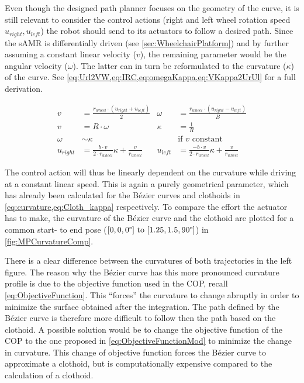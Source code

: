 Even though the designed path planner focuses on the geometry of the curve, it is still relevant to consider the control actions (right and left wheel rotation speed $u_{right},u_{left}$) the robot should send to its actuators to follow a desired path. Since the sAMR is differentially driven (see \cref{sec:WheelchairPlatform}) and by further assuming a constant linear velocity ($v$), the remaining parameter would be the angular velocity ($\omega$). The latter can in turn be reformulated to the curvature ($\kappa$) of the curve. See \cref{eq:Url2VW,eq:IRC,eq:omegaKappa,eq:VKappa2UrUl} for a full derivation. 

\begin{align}
v &= \frac{r_{wheel}\cdot(u_{right} + u_{left})}{2} & \omega &= \frac{r_{wheel}\cdot(u_{right} - u_{left})}{B} \label{eq:Url2VW} \\
v & = R \cdot \omega & \kappa &= \frac{1}{R} \label{eq:IRC}\\
\omega & \sim \kappa & &\text{if $v$ constant} \label{eq:omegaKappa} \\
u_{right} & = \frac{b\cdot v}{2\cdot r_{wheel}} \kappa + \frac{v}{r_{wheel}} & u_{left} & = \frac{-b \cdot v}{2\cdot r_{wheel}} \kappa + \frac{v}{r_{wheel}} \label{eq:VKappa2UrUl}
\end{align}

\vspace{1em}

The control action will thus be linearly dependent on the curvature while driving at a constant linear speed. This is again a purely geometrical parameter, which has already been calculated for the Bézier curves and clothoids in \cref{eq:curvature,eq:Cloth_kappa} respectively. 
To compare the effort the actuator has to make, the curvature of the Bézier curve and the clothoid are plotted for a common start- to end pose ($[0,0,0\degree] \text{ to } [1.25,1.5,90\degree]$) in \cref{fig:MPCurvatureComp}. 

There is a clear difference between the curvatures of both trajectories in the left figure. The reason why the Bézier curve has this more pronounced curvature profile is due to the objective function used in the COP, recall \cref{eq:ObjectiveFunction}. This ``forces'' the curvature to change abruptly in order to minimize the surface obtained after the integration. The path defined by the Bézier curve is therefore more difficult to follow then the path based on the clothoid. A possible solution would be to change the objective function of the COP to the one proposed in \cref{eq:ObjectiveFunctionMod} to minimize the change in curvature. This change of objective function forces the Bézier curve to approximate a clothoid, but is computationally expensive compared to the calculation of a clothoid.


